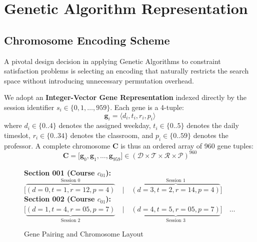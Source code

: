 
\chapter{Genetic Algorithm Representation}

\section{Chromosome Encoding Scheme}
A pivotal design decision in applying Genetic Algorithms to constraint satisfaction problems is selecting an encoding that naturally restricts the search space without introducing unnecessary permutation overhead.

We adopt an \textbf{Integer-Vector Gene Representation} indexed directly by the session identifier $s_i \in \{0, 1, \dots, 959\}$. Each gene is a 4-tuple:
\begin{equation}
  \mathbf{g}_i = \langle d_i, t_i, r_i, p_i \rangle
\end{equation}
where $d_i \in \{0..4\}$ denotes the assigned weekday, $t_i \in \{0..5\}$ denotes the daily timeslot, $r_i \in \{0..34\}$ denotes the classroom, and $p_i \in \{0..59\}$ denotes the professor. A complete chromosome $\mathbf{C}$ is thus an ordered array of 960 gene tuples:
\begin{equation}
  \mathbf{C} = \big[ \mathbf{g}_0, \mathbf{g}_1, \dots, \mathbf{g}_{959} \big] \in (\mathcal{D} \times \mathcal{T} \times \mathcal{R} \times \mathcal{P})^{960}
\end{equation}

\begin{figure}[H]
  \centering
  \begin{tcolorbox}[colback=PrismLabel!15, colframe=PrismHeader, width=0.95\linewidth, title=Chromosome Structural Schema]
    \centering
    \small
    \textbf{Section 001 (Course $c_{01}$):} $\big[ \overbrace{(d=0, t=1, r=12, p=4)}^{\text{Session 0}} \quad \vert \quad \overbrace{(d=3, t=2, r=14, p=4)}^{\text{Session 1}} \big]$\\
    \vspace{2pt}
    \textbf{Section 002 (Course $c_{01}$):} $\big[ \underbrace{(d=1, t=4, r=05, p=7)}_{\text{Session 2}} \quad \vert \quad \underbrace{(d=4, t=5, r=05, p=7)}_{\text{Session 3}} \big] \quad \dots$
  \end{tcolorbox}
  \caption{Gene Pairing and Chromosome Layout}
  \label{fig:chromosome_schema}
\end{figure}

